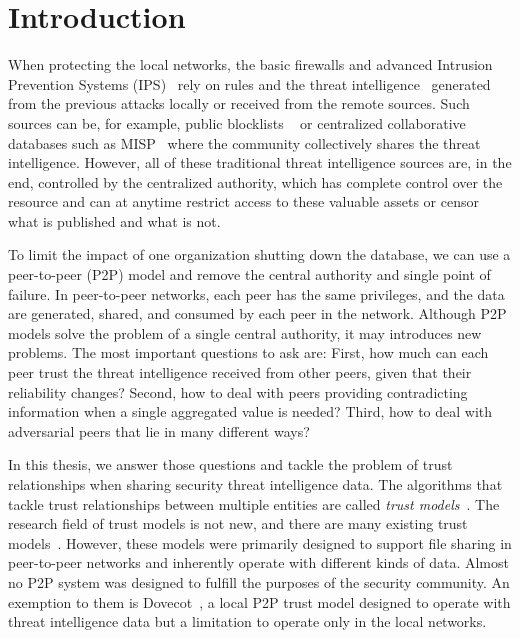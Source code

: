 \chapter{Introduction}
\label{ch:introduction}



When protecting the local networks, the basic firewalls and advanced Intrusion Prevention Systems (IPS)~\cite{zhang2004intrusion} rely on rules and the threat intelligence~\cite{threatintelligence} generated from the previous attacks locally or received from the remote sources.
Such sources can be, for example, public blocklists ~\cite{abuseipdb, dataplane, binarydefense} or centralized collaborative databases such as MISP~\cite{wagner2016misp} where the community collectively shares the threat intelligence.
However, all of these traditional threat intelligence sources are, in the end, controlled by the centralized authority, which has complete control over the resource and can at anytime restrict access to these valuable assets or censor what is published and what is not.

To limit the impact of one organization shutting down the database, we can use a peer-to-peer (P2P) model and remove the central authority and single point of failure.
In peer-to-peer networks, each peer has the same privileges, and the data are generated, shared, and consumed by each peer in the network.
Although P2P models solve the problem of a single central authority, it may introduces new problems. The most important questions to ask are: First, how much can each peer trust the threat intelligence received from other peers, given that their reliability changes? Second, how to deal with peers providing contradicting information when a single aggregated value is needed? Third, how to deal with adversarial peers that lie in many different ways?

In this thesis, we answer those questions and tackle the problem of trust relationships when sharing security threat intelligence data.
The algorithms that tackle trust relationships between multiple entities are called \textit{trust models}~\cite{wang2003trust}.
The research field of trust models is not new, and there are many existing trust models~\cite{abera2019sadan, sort, christensen2014hybrid, 1562680, huynh2006integrated, kamvar2003eigentrust, li2014design, pinyol2013computational, xiong2004peertrust}.
However, these models were primarily designed to support file sharing in peer-to-peer networks and inherently operate with different kinds of data. Almost no P2P system was designed to fulfill the purposes of the security community.
An exemption to them is Dovecot~\cite{dita}, a local P2P trust model designed to operate with threat intelligence data but a limitation to operate only in the local networks.


